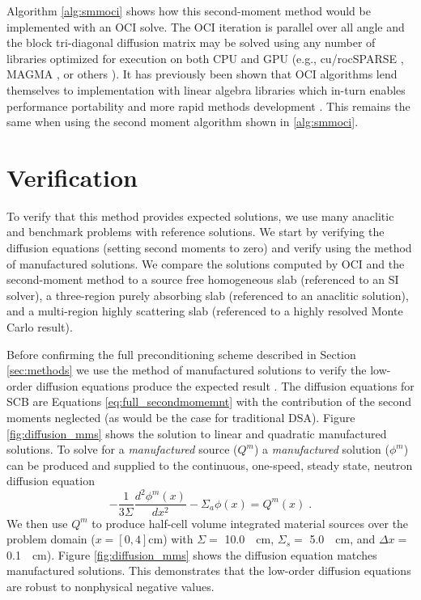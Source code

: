 Algorithm \ref{alg:smmoci} shows how this second-moment method would be implemented with an OCI solve.
The OCI iteration is parallel over all angle and the block tri-diagonal diffusion matrix may be solved using any number of libraries optimized for execution on both CPU and GPU (e.g., cu/rocSPARSE \cite{cusparse, rocsparse}, MAGMA \cite{magma}, or others \cite{liwen_2012_solveable, klein_2023_tridiag}).
It has previously been shown that OCI algorithms lend themselves to implementation with linear algebra libraries which in-turn enables performance portability and more rapid methods development \cite{morgan_2025_oci}.
This remains the same when using the second moment algorithm shown in \ref{alg:smmoci}.


\section{Verification}

To verify that this method provides expected solutions, we use many anaclitic and benchmark problems with reference solutions.
We start by verifying the diffusion equations (setting second moments to zero) and verify using the method of manufactured solutions.
We compare the solutions computed by OCI and the second-moment method to a source free homogeneous slab (referenced to an SI solver), a three-region purely absorbing slab (referenced to an anaclitic solution), and a multi-region highly scattering slab (referenced to a highly resolved Monte Carlo result). 

Before confirming the full preconditioning scheme described in Section \ref{sec:methods} we use the method of manufactured solutions to verify the low-order diffusion equations produce the expected result \cite{warsa_mms_2010, moosemms}.
The diffusion equations for SCB are Equations \eqref{eq:full_secondmomemnt} with the contribution of the second moments neglected (as would be the case for traditional DSA).
Figure \ref{fig:diffusion_mms} shows the solution to linear and quadratic manufactured solutions.
To solve for a \textit{manufactured} source ($Q^m$) a \textit{manufactured} solution ($\phi^m$) can be produced and supplied to the continuous, one-speed, steady state, neutron diffusion equation
\begin{equation}
    -\frac{1}{3\Sigma}\frac{d^2\phi^m(x)}{dx^2} - \Sigma_a\phi(x)  = Q^m(x) \;.
\end{equation}
We then use $Q^m$ to produce half-cell volume integrated material sources over the problem domain ($x=[0,4]$\unit{\centi\meter}) with $\Sigma =$ \SI{10.0}{\per\centi\meter}, $\Sigma_s =$ \SI{5.0}{\per\centi\meter}, and $\Delta x =$ \SI{0.1}{\per\centi\meter}).
Figure \ref{fig:diffusion_mms} shows the diffusion equation matches manufactured solutions.
This demonstrates that the low-order diffusion equations are robust to nonphysical negative values.

